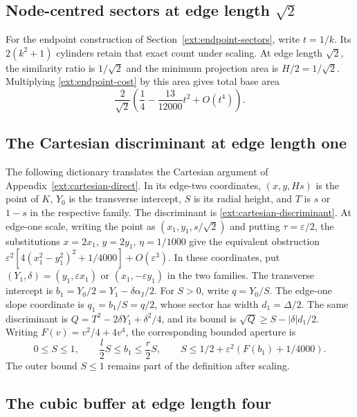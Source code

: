 \subsection{Node-centred sectors at edge length \texorpdfstring{$\sqrt2$}{sqrt(2)}}
\label{ext:endpoint-scaled}

For the endpoint construction of Section~\ref{ext:endpoint-sectors},
write $t=1/k$.  Its $2(k^2+1)$ cylinders retain that exact count under
scaling.  At edge length $\sqrt2$, the similarity ratio is $1/\sqrt2$
and the minimum projection area is $H/2=1/\sqrt2$.  Multiplying
\eqref{ext:endpoint-cost} by this area gives total base area
\begin{equation}\label{ext:endpoint-scaled-cost}
 \frac{2}{\sqrt2}\left(\frac14-\frac{13}{12000}t^2+O(t^4)\right).
\end{equation}

\subsection{The Cartesian discriminant at edge length one}
\label{ext:cartesian-edge-one}

The following dictionary translates the Cartesian argument of
Appendix~\ref{ext:cartesian-direct}.  In its edge-two coordinates,
$(x,y,Hs)$ is the point of $K$, $Y_0$ is the transverse intercept,
$S$ is its radial height, and $T$ is $s$ or $1-s$ in the respective
family.  The discriminant is \eqref{ext:cartesian-discriminant}.
At edge-one scale, writing the point as $(x_1,y_1,s/\sqrt2)$ and
putting $\tau=\varepsilon/2$, the substitutions
$x=2x_1$, $y=2y_1$, $\eta=1/1000$ give the equivalent obstruction
$\varepsilon^2[4(x_1^2-y_1^2)^2+1/4000]+O(\varepsilon^3)$.
In these coordinates, put $(Y_1,\delta)=(y_1,\varepsilon x_1)$
or $(x_1,-\varepsilon y_1)$ in the two families.  The transverse
intercept is $b_1=Y_0/2=Y_1-\delta\alpha_I/2$.
For $S>0$, write $q=Y_0/S$. The edge-one slope coordinate is
$q_1=b_1/S=q/2$, whose sector has width $d_1=\Delta/2$.
The same discriminant is $Q=T^2-2\delta Y_1+\delta^2/4$, and its
bound is $\sqrt Q\ge S-|\delta|d_1/2$.
Writing $F(v)=v^2/4+4v^4$, the corresponding bounded aperture is
\[
 0\le S\le1,\qquad
 \frac l2S\le b_1\le\frac r2S,\qquad
 S\le1/2+\varepsilon^2(F(b_1)+1/4000).
\]
The outer bound $S\le1$ remains part of the definition after scaling.

\subsection{The cubic buffer at edge length four}
\label{ext:cubic-edge-four}

